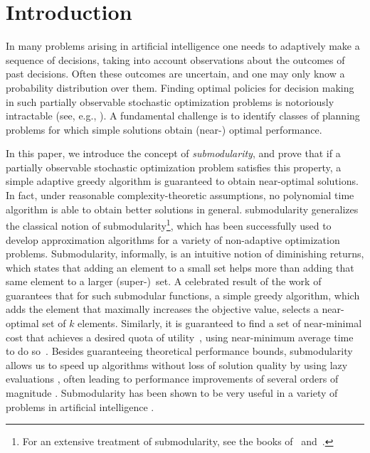 %
\section{Introduction} \label{sec:intro}
%
%
 In many  problems arising in artificial intelligence one
needs to adaptively make a sequence of decisions, taking into account
observations about the outcomes of past decisions.  Often these
outcomes are uncertain, and one may only know a probability
distribution over them.  Finding optimal policies for decision making
in such partially observable stochastic optimization problems is
notoriously intractable (see, e.g., \citet{littman98computational}).  A fundamental challenge is to identify classes of planning problems for which simple solutions obtain (near-) optimal performance.


In this paper, we 
introduce the concept of \emph{\term submodularity}, and prove that
if a partially observable stochastic optimization problem satisfies this property, a simple adaptive greedy
algorithm is guaranteed to obtain near-optimal solutions. In fact, under reasonable complexity-theoretic assumptions, no polynomial time algorithm is able to obtain better solutions in general.
\Term
  submodularity generalizes the classical notion of submodularity\footnote{For
  an extensive treatment of submodularity, see the books
  of~\citet{fujishige05} and~\citet{SchrijverB}.}, which has
been successfully used to develop approximation algorithms for a
variety of non-adaptive optimization problems. 
 Submodularity, informally, is an intuitive notion of diminishing
 returns, which states that adding an element to a small set helps
 more than adding that same element to a larger (super-)\ set.  A
 celebrated result of the work of~\citet{nemhauser78} guarantees that for such
 submodular functions, a simple greedy algorithm, which adds the element that maximally increases the objective value, selects a near-optimal set of $k$ elements.  
Similarly, it is guaranteed to find a set of near-minimal cost that
achieves a desired quota of utility~\citep{wolsey82}, using 
near-minimum average time to do so~\citep{streeter08}.
Besides guaranteeing theoretical performance bounds, submodularity allows us
to speed up algorithms without loss of solution quality by using lazy evaluations \citep{minoux78},
often leading to performance improvements of several orders of
magnitude \citep{leskovec07}.  Submodularity has been shown to be very useful in a variety of problems in artificial intelligence \citep{krause09ijcaitut}.


